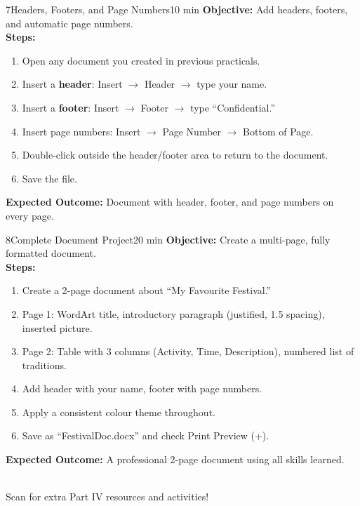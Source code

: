 \begin{labactivity}{7}{Headers, Footers, and Page Numbers}{10 min}
\textbf{Objective:} Add headers, footers, and automatic page numbers.\\[4pt]
\textbf{Steps:}
\begin{enumerate}[label=\protect\stepcircle{\arabic*}, leftmargin=2cm, itemsep=4pt]
  \item Open any document you created in previous practicals.
  \item Insert a \textbf{header}: Insert $\rightarrow$ Header $\rightarrow$ type your name.
  \item Insert a \textbf{footer}: Insert $\rightarrow$ Footer $\rightarrow$ type ``Confidential.''
  \item Insert page numbers: Insert $\rightarrow$ Page Number $\rightarrow$ Bottom of Page.
  \item Double-click outside the header/footer area to return to the document.
  \item Save the file.
\end{enumerate}
\textbf{Expected Outcome:} Document with header, footer, and page numbers on every page.
\welldone
\end{labactivity}

\begin{labactivity}{8}{Complete Document Project}{20 min}
\textbf{Objective:} Create a multi-page, fully formatted document.\\[4pt]
\textbf{Steps:}
\begin{enumerate}[label=\protect\stepcircle{\arabic*}, leftmargin=2cm, itemsep=4pt]
  \item Create a 2-page document about ``My Favourite Festival.''
  \item Page 1: WordArt title, introductory paragraph (justified, 1.5 spacing), inserted picture.
  \item Page 2: Table with 3 columns (Activity, Time, Description), numbered list of traditions.
  \item Add header with your name, footer with page numbers.
  \item Apply a consistent colour theme throughout.
  \item Save as ``FestivalDoc.docx'' and check Print Preview (+).
\end{enumerate}
\textbf{Expected Outcome:} A professional 2-page document using all skills learned.
\welldone
\end{labactivity}

\vspace{12pt}
\begin{center}
  \\[6pt]
  {\small\sffamily\textcolor{NavyBlue}{Scan for extra Part IV resources and activities!}}
\end{center}
